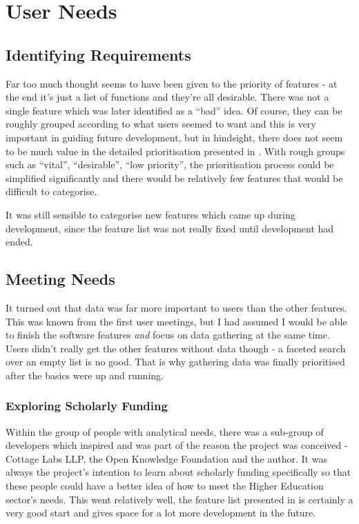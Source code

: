 \section{User Needs}
\subsection{Identifying Requirements}
Far too much thought seems to have been given to the priority of features - at the end it's just a list of functions and they're all desirable. There was not a single feature which was later identified as a ``bad'' idea. Of course, they can be roughly grouped according to what users seemed to want and this is very important in guiding future development, but in hindsight, there does not seem to be much value in the detailed prioritisation presented in . With rough groups such as ``vital'', ``desirable'', ``low priority'', the prioritisation process could be simplified significantly and there would be relatively few features that would be difficult to categorise.

It was still sensible to categorise new features which came up during development, since the feature list was not really fixed until development had ended.

\subsection{Meeting Needs}

It turned out that data was far more important to users than the other features. This was known from the first user meetings, but I had assumed I would be able to finish the software features \emph{and} focus on data gathering at the same time. Users didn't really get the other features without data though - a faceted search over an empty list is no good. That is why gathering data was finally prioritised after the basics were up and running.

\subsubsection{Exploring Scholarly Funding}
Within the group of people with analytical needs, there was a sub-group of developers which inspired and was part of the reason the project was conceived - Cottage Labs LLP, the Open Knowledge Foundation and the author. It was always the project's intention to learn about scholarly funding specifically so that these people could have a better idea of how to meet the Higher Education sector's needs. This went relatively well, the feature list presented in  is certainly a very good start and gives space for a lot more development in the future.

